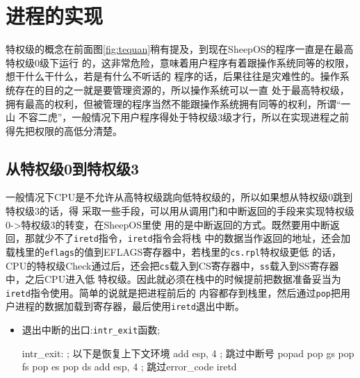 \section{进程的实现}
\label{sec:course}
特权级的概念在前面图\ref{fig:tequan}稍有提及，到现在SheepOS的程序一直是在最高特权级0级下运行
的，这非常危险，意味着用户程序有着跟操作系统同等的权限，想干什么干什么，若是有什么不听话的
程序的话，后果往往是灾难性的。操作系统存在的目的之一就是要管理资源的，所以操作系统可以一直
处于最高特权级，拥有最高的权利，但被管理的程序当然不能跟操作系统拥有同等的权利，所谓“一山
不容二虎”，一般情况下用户程序得处于特权级3级才行，所以在实现进程之前得先把权限的高低分清楚。

\subsection{从特权级0到特权级3}
一般情况下CPU是不允许从高特权级跳向低特权级的，所以如果想从特权级0跳到特权级3的话，得
采取一些手段，可以用从调用门和中断返回的手段来实现特权级0->特权级3的转变，在SheepOS里使
用的是中断返回的方式。既然要用中断返回，那就少不了\texttt{iretd}指令\cite{ws2013}，\texttt{iretd}指令会将栈
中的数据当作返回的地址，还会加载栈里的\texttt{eflags}的值到EFLAGS寄存器中，若栈里的\texttt{cs.rpl}特权级更低
的话，CPU的特权级Check通过后，还会把\texttt{cs}载入到CS寄存器中，\texttt{ss}载入到SS寄存器中，之后CPU进入低
特权级。因此就必须在栈中的时候提前把数据准备妥当为\texttt{iretd}指令使用。简单的说就是把进程前后的
内容都存到栈里，然后通过\texttt{pop}把用户进程的数据加载到寄存器，最后使用\texttt{iretd}退出中断。
\begin{itemize}
\item 退出中断的出口:\texttt{intr\_exit}函数;
\begin{codeblock}
\begin{nasmcode}
intr_exit:	     
; 以下是恢复上下文环境
   add esp, 4 ; 跳过中断号
   popad
   pop gs
   pop fs
   pop es
   pop ds
   add esp, 4 ; 跳过error_code
   iretd
\end{nasmcode}  
\end{codeblock}
\end{itemize}

